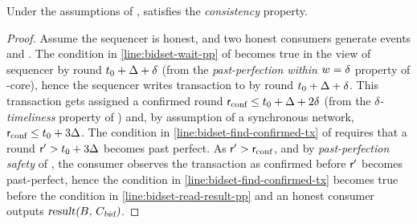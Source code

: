 \begin{lemma}[Consistency]\label{lem:bidset-consistencys}
    Under the assumptions of ,  satisfies the \emph{consistency} property.
\end{lemma}
\begin{proof}
    Assume the sequencer is honest, and two honest consumers generate events  and .
    The condition in \cref{line:bidset-wait-pp} of  becomes true in the view of sequencer by round $t_0 + \Delta + \delta$ (from the \emph{past-perfection within $w=\delta$} property of \podtm-core),
    hence the sequencer writes transaction \msgbidresult{(\bag, \bidcert, \sigma)} to \podtm by round $t_0 + \Delta + \delta$.
    This transaction gets assigned a confirmed round $\textsf{r}_\text{conf} \leq t_0 + \Delta + 2\delta$ (from the \emph{$\delta$-timeliness} property of \podtm) and,
    by assumption of a synchronous network, $\textsf{r}_\text{conf} \leq t_0 + 3 \Delta$.
    The condition in \cref{line:bidset-find-confirmed-tx} of  requires that a round $\textsf{r}' > t_0 + 3 \Delta$ becomes past perfect.
    As $\textsf{r}' > \textsf{r}_\text{conf}$, and by \emph{past-perfection safety} of \podtm, the consumer observes the transaction as confirmed before $\textsf{r}'$ becomes past-perfect, hence the condition in \cref{line:bidset-find-confirmed-tx} becomes true before the condition in \cref{line:bidset-read-result-pp} and an honest consumer outputs $\textsl{result(\ensuremath{B}, \ensuremath{C_\text{bid}})}$.
\end{proof}

